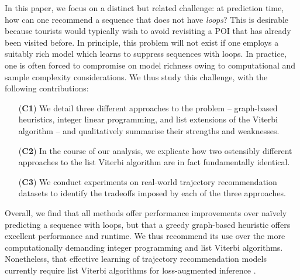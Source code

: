 In this paper, we focus on a distinct but related challenge:
at prediction time, how can one recommend a sequence that does not have \emph{loops}?
This is desirable because tourists would typically wish to avoid revisiting a POI that has already been visited before.
In principle, this problem will not exist if one employs a suitably rich model which learns to suppress sequences with loops.
In practice, one is often forced to compromise on model richness owing to computational and sample complexity considerations.
We thus study this challenge, with the following contributions:
\begin{enumerate}
	\item[(\textbf{C1})] We detail three different approaches to the problem -- 
	graph-based heuristics,
	integer linear programming,
	and
	list extensions of the Viterbi algorithm
	-- and qualitatively summarise their strengths and weaknesses.
	\item[(\textbf{C2})] In the course of our analysis, we explicate how two ostensibly different approaches to the list Viterbi algorithm \citep{seshadri1994list,nilsson2001sequentially} are in fact fundamentally identical.
	\item[(\textbf{C3})] We conduct experiments on real-world trajectory recommendation datasets to identify the tradeoffs imposed by each of the three approaches.
\end{enumerate}
Overall, we find that
all methods offer performance improvements over na\"{i}vely predicting a sequence with loops,
but that
a greedy graph-based heuristic offers excellent performance and runtime.
We thus recommend its use over the more computationally demanding integer programming and list Viterbi algorithms. 
Nonetheless, that effective learning of trajectory recommendation models currently require list Viterbi algorithms for loss-augmented inference \cite{Chen:2017}.

